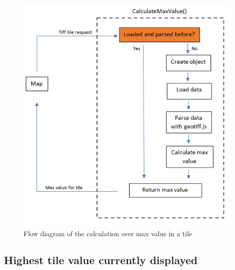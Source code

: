 \begin{figure} [H]
	\centering
	\includegraphics[width=.8\textwidth]{Pictures/CalculateMaxValue}
	\caption{Flow diagram of the calculation over max value in a tile}
	\label{CalculateMaxValue}
\end{figure}



\subsection{Highest tile value currently displayed}


